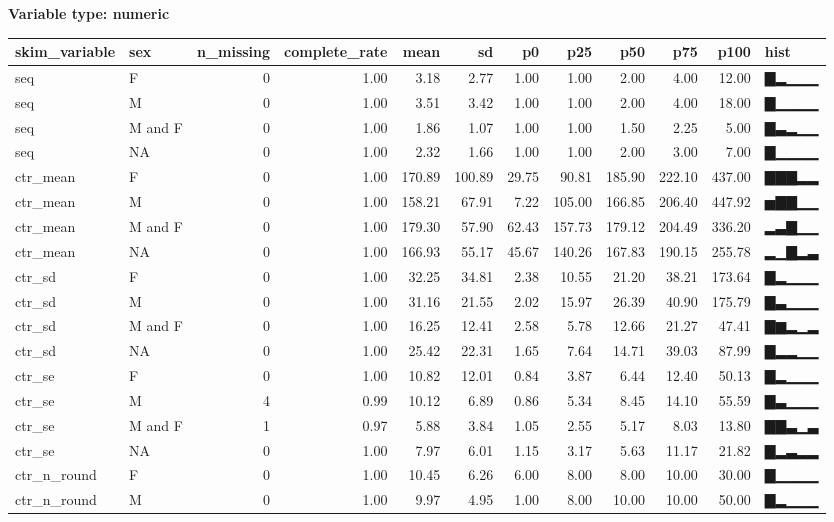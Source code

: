 \documentclass[
]{article}
\begin{document}
\textbf{Variable type: numeric}

\begin{longtable}[]{@{}llrrrrrrrrrl@{}}
\toprule
skim\_variable & sex & n\_missing & complete\_rate & mean & sd & p0 &
p25 & p50 & p75 & p100 & hist \\
\midrule
\endhead
seq & F & 0 & 1.00 & 3.18 & 2.77 & 1.00 & 1.00 & 2.00 & 4.00 & 12.00 &
▇▂▁▁▁ \\
seq & M & 0 & 1.00 & 3.51 & 3.42 & 1.00 & 1.00 & 2.00 & 4.00 & 18.00 &
▇▁▁▁▁ \\
seq & M and F & 0 & 1.00 & 1.86 & 1.07 & 1.00 & 1.00 & 1.50 & 2.25 &
5.00 & ▇▃▂▁▁ \\
seq & NA & 0 & 1.00 & 2.32 & 1.66 & 1.00 & 1.00 & 2.00 & 3.00 & 7.00 &
▇▁▁▁▁ \\
ctr\_mean & F & 0 & 1.00 & 170.89 & 100.89 & 29.75 & 90.81 & 185.90 &
222.10 & 437.00 & ▇▇▇▂▂ \\
ctr\_mean & M & 0 & 1.00 & 158.21 & 67.91 & 7.22 & 105.00 & 166.85 &
206.40 & 447.92 & ▅▇▇▁▁ \\
ctr\_mean & M and F & 0 & 1.00 & 179.30 & 57.90 & 62.43 & 157.73 &
179.12 & 204.49 & 336.20 & ▂▃▇▁▁ \\
ctr\_mean & NA & 0 & 1.00 & 166.93 & 55.17 & 45.67 & 140.26 & 167.83 &
190.15 & 255.78 & ▂▁▇▂▃ \\
ctr\_sd & F & 0 & 1.00 & 32.25 & 34.81 & 2.38 & 10.55 & 21.20 & 38.21 &
173.64 & ▇▂▁▁▁ \\
ctr\_sd & M & 0 & 1.00 & 31.16 & 21.55 & 2.02 & 15.97 & 26.39 & 40.90 &
175.79 & ▇▃▁▁▁ \\
ctr\_sd & M and F & 0 & 1.00 & 16.25 & 12.41 & 2.58 & 5.78 & 12.66 &
21.27 & 47.41 & ▇▆▂▁▂ \\
ctr\_sd & NA & 0 & 1.00 & 25.42 & 22.31 & 1.65 & 7.64 & 14.71 & 39.03 &
87.99 & ▇▂▂▁▁ \\
ctr\_se & F & 0 & 1.00 & 10.82 & 12.01 & 0.84 & 3.87 & 6.44 & 12.40 &
50.13 & ▇▂▁▁▁ \\
ctr\_se & M & 4 & 0.99 & 10.12 & 6.89 & 0.86 & 5.34 & 8.45 & 14.10 &
55.59 & ▇▃▁▁▁ \\
ctr\_se & M and F & 1 & 0.97 & 5.88 & 3.84 & 1.05 & 2.55 & 5.17 & 8.03 &
13.80 & ▇▇▃▁▃ \\
ctr\_se & NA & 0 & 1.00 & 7.97 & 6.01 & 1.15 & 3.17 & 5.63 & 11.17 &
21.82 & ▇▂▃▂▂ \\
ctr\_n\_round & F & 0 & 1.00 & 10.45 & 6.26 & 6.00 & 8.00 & 8.00 & 10.00
& 30.00 & ▇▁▁▁▁ \\
ctr\_n\_round & M & 0 & 1.00 & 9.97 & 4.95 & 1.00 & 8.00 & 10.00 & 10.00
& 50.00 & ▇▂▁▁▁ \\

\end{longtable}
\end{document}
